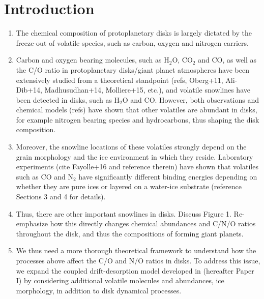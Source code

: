 \documentclass[apj]{emulateapj}
\begin{document}
\section{Introduction}
\label{sec:intro}

\begin {enumerate}
\item The chemical composition of protoplanetary disks is largely dictated by the freeze-out of volatile species, such as carbon, oxygen and nitrogen carriers.  

\item Carbon and oxygen bearing molecules, such as H$_2$O, CO$_2$ and CO, as well as the C/O ratio in protoplanetary disks/giant planet atmospheres have been extensively studied from a theoretical standpoint (refs, Oberg+11, Ali-Dib+14, Madhusudhan+14, Molliere+15, etc.), and volatile snowlines have been detected in disks, such as H$_2$O and CO. However, both observations and chemical models (refs) have shown that other volatiles are abundant in disks, for example nitrogen bearing species and hydrocarbons, thus shaping the disk composition.

\item Moreover, the snowline locations of these volatiles strongly depend on the grain morphology and the ice environment in which they reside. Laboratory experiments (cite Fayolle+16 and reference therein) have shown that volatiles such as CO and N$_2$ have significantly different binding energies depending on whether they are pure ices or layered on a water-ice substrate (reference Sections 3 and 4 for details). 

\item Thus, there are other important snowlines in disks. Discuss Figure 1. Re-emphasize how this directly changes chemical abundances and C/N/O ratios throughout the disk, and thus the compositions of forming giant planets. 

\item We thus need a more thorough theoretical framework to understand how the processes above affect the C/O and N/O ratios in disks.  To address this issue, we expand the coupled drift-desorption model developed in \citet{piso15b} (hereafter Paper I) by considering additional volatile molecules and abundances, ice morphology, in addition to disk dynamical processes. 

\end {enumerate}
\end{document}
